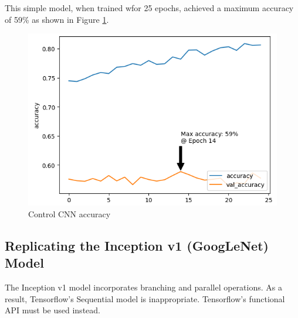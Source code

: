 \documentclass{article}
\begin{document}
This simple model, when trained wfor 25 epochs, achieved a maximum accuracy of 59\% as shown in Figure \ref{fig:cnn-control-accuracy}.


\begin{figure}[ht]
    \centering
    \includegraphics[scale=0.7]{project/paper_images/control_cnn_accuracy.png}
    \caption{Control CNN accuracy}
    \label{fig:cnn-control-accuracy}
\end{figure}


\clearpage



\subsection{Replicating the Inception v1 (GoogLeNet) Model}
The Inception v1 model incorporates branching and parallel operations. As a result, Tensorflow's Sequential  model is inappropriate. Tensorflow's functional API must be used instead.





\end{document}
